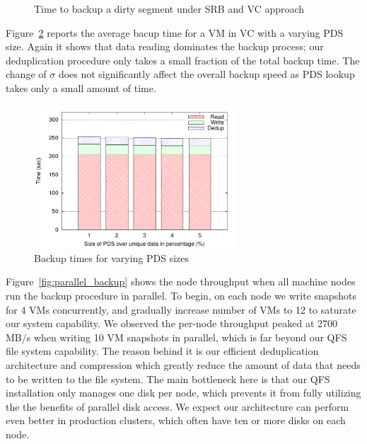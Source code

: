 
\begin{figure}[htbp]
  \centering
  \caption{Time to backup a dirty segment under SRB and VC approach}
  \label{fig:srb_vs_vc}
\end{figure}

Figure~\ref{fig:single_vm_backup} reports the average bacup time for a VM in VC with a varying PDS size.
Again it shows that data reading dominates the backup process; our deduplication
procedure only takes a small fraction of the total backup time. 
The change of $\sigma$ does not significantly affect the overall backup speed as
PDS lookup takes only a small amount of time.


\begin{figure}
    \centering
    \includegraphics[width=3in]{figures/single_backup_time}
    \caption{Backup times for varying PDS sizes}
    \label{fig:single_vm_backup}
\end{figure}


    Figure~\ref{fig:parallel_backup} shows the node throughput when all machine nodes run
the backup procedure in parallel.
To begin, on each node we write snapshots for 4 VMs concurrently, and gradually 
increase number of VMs to 12 to saturate our system capability. We observed 
the per-node throughput peaked at 2700 MB/s when writing 10 VM snapshots in parallel, 
which is far beyond our QFS file system capability. The reason behind it is our efficient
deduplication architecture and compression which greatly reduce the amount of data that needs to be written to
the file system. The main bottleneck here is that our QFS installation only
manages one disk per node, which prevents it from fully utilizing the the
benefits of parallel disk access. We expect our architecture can
perform even better in production clusters, which often have ten or more disks on each node.



